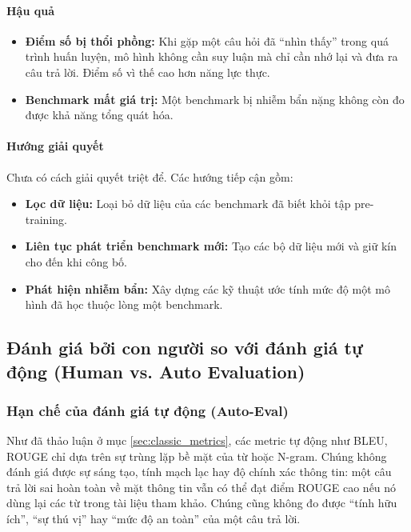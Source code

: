 \paragraph{Hậu quả}
\begin{itemize}
    \item \textbf{Điểm số bị thổi phồng:} Khi gặp một câu hỏi đã “nhìn thấy” trong quá trình huấn luyện, mô hình không cần suy luận mà chỉ cần nhớ lại và đưa ra câu trả lời. Điểm số vì thế cao hơn năng lực thực.
    \item \textbf{Benchmark mất giá trị:} Một benchmark bị nhiễm bẩn nặng không còn đo được khả năng tổng quát hóa.
\end{itemize}

\paragraph{Hướng giải quyết}
Chưa có cách giải quyết triệt để. Các hướng tiếp cận gồm:
\begin{itemize}
    \item \textbf{Lọc dữ liệu:} Loại bỏ dữ liệu của các benchmark đã biết khỏi tập pre-training.
    \item \textbf{Liên tục phát triển benchmark mới:} Tạo các bộ dữ liệu mới và giữ kín cho đến khi công bố.
    \item \textbf{Phát hiện nhiễm bẩn:} Xây dựng các kỹ thuật ước tính mức độ một mô hình đã học thuộc lòng một benchmark.
\end{itemize}

\subsection{Đánh giá bởi con người so với đánh giá tự động (Human vs. Auto Evaluation)}
\label{ssec:human_vs_auto_eval}

\subsubsection{Hạn chế của đánh giá tự động (Auto-Eval)}
Như đã thảo luận ở mục \ref{sec:classic_metrics}, các metric tự động như BLEU, ROUGE chỉ dựa trên sự trùng lặp bề mặt của từ hoặc N-gram. Chúng không đánh giá được sự sáng tạo, tính mạch lạc hay độ chính xác thông tin: một câu trả lời sai hoàn toàn về mặt thông tin vẫn có thể đạt điểm ROUGE cao nếu nó dùng lại các từ trong tài liệu tham khảo. Chúng cũng không đo được “tính hữu ích”, “sự thú vị” hay “mức độ an toàn” của một câu trả lời.

